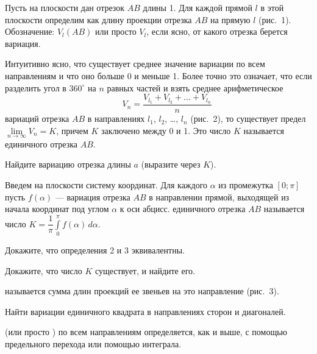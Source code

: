 \documentclass[a4paper,10pt]{article}
\begin{document}


Пусть на плоскости дан отрезок $AB$ длины 1.
Для каждой прямой $l$ в этой плоскости
определим  как длину
проекции отрезка $AB$ на прямую $l$ (рис.~1).
Обозначение: $V_l(AB)$ или просто
$V_l$, если ясно, от какого отрезка берется вариация.

Интуитивно ясно, что существует среднее значение вариации по
всем направлениям
\noindent
{}
и что оно больше 0 и меньше 1. Более
точно это означает, что если разделить угол в $360^\circ$
на $n$ равных частей и взять среднее
арифметическое
\vspace{-2mm}
$$
\quad \quad V_n=\frac{V_{l_1}+V_{l_2}+\dots+V_{l_n}}{n}
$$
\vspace{-6mm}
\noindent
вариаций отрезка $AB$ в направлениях $l_1$, $l_2$, \dots, $l_n$
(рис.~2), то существует предел $\lim\limits_{n\rightarrow\infty}V_n=K$,
причем $K$ заключено между 0 и 1.
Это число $K$ называется  единичного
отрезка $AB$.

Найдите вариацию отрезка длины $a$ (выразите через $K$).


Введем на плоскости систему координат. Для каждого $\alpha$ из промежутка
$[0;\pi]$ пусть $f(\alpha)$ --- вариация
отрезка $AB$ в направлении прямой, выходящей из начала координат под
углом $\alpha$ к оси абцисс.
 единичного отрезка $AB$ называется число
$%
K=\dfrac{1}{\pi}\int\limits_0^{\pi}f(\alpha)\, d\alpha.
$%

Докажите, что определения 2 и 3 эквивалентны.

Докажите, что число $K$ существует,
и найдите его.



 называется
сумма длин проекций ее звеньев на это направление (рис.~3).

Найти вариации единичного квадрата %
в направлениях %
сторон и диагоналей.

 (или просто )
по всем \noindent направлениям определяется, как и выше, с помощью предельного
перехода или помощью интеграла.
\end{document}
